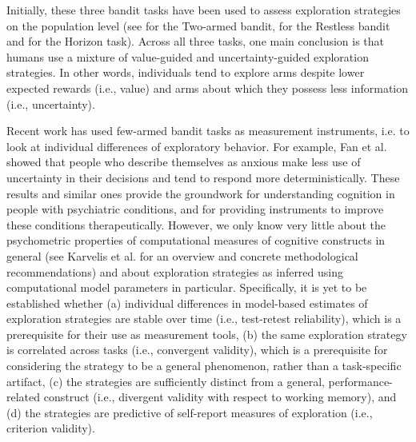 \documentclass[fleqn,10pt]{wlscirep}
\begin{document}
Initially, these three bandit tasks have been used to assess exploration strategies on the population level (see \cite{banks_experimental_1997, gershman_deconstructing_2018, tomov2020dissociable} for the Two-armed bandit, \cite{daw_cortical_2006, speekenbrink_uncertainty_2015, navarro_aversion_2018, ferguson_humans_2023, speekenbrink_chasing_2022, schulz_algorithmic_2019} for the Restless bandit and \cite{wilson_humans_2014, zajkowski_causal_2017} for the Horizon task). Across all three tasks, one main conclusion is that humans use a mixture of value-guided and uncertainty-guided exploration strategies. In other words, individuals tend to explore arms despite lower expected rewards (i.e., value) and arms about which they possess less information (i.e., uncertainty).

Recent work has used few-armed bandit tasks as measurement instruments, i.e. to look at individual differences of exploratory behavior. For example, Fan et al.\cite{fan_trait_2023} showed that people who describe themselves as anxious make less use of uncertainty in their decisions and tend to respond more deterministically. These results and similar ones \cite{blanco_2013, dubois_2022, dubois_human_2021, aberg_2022, smith_lower_2022} provide the groundwork for understanding cognition in people with psychiatric conditions, and for providing instruments to improve these conditions therapeutically. However, we only know very little about the psychometric properties of computational measures of cognitive constructs in general (see Karvelis et al.\cite{karvelis_individual_2023} for an overview and concrete methodological recommendations) and about exploration strategies as inferred using computational model parameters in particular. Specifically, it is yet to be established whether (a) individual differences in model-based estimates of exploration strategies are stable over time (i.e., test-retest reliability), which is a prerequisite for their use as measurement tools, (b) the same exploration strategy is correlated across tasks (i.e., convergent validity), which is a prerequisite for considering the strategy to be a general phenomenon, rather than a task-specific artifact, (c) the strategies are sufficiently distinct from a general, performance-related construct (i.e., divergent validity with respect to working memory), and (d) the strategies are predictive of self-report measures of exploration (i.e., criterion validity).
\end{document}
